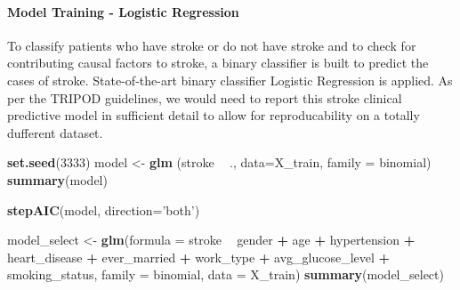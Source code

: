 \documentclass[]{article}
\newenvironment{Shaded}{\begin{snugshade}}{\end{snugshade}}
\newcommand{\DataTypeTok}[1]{\textcolor[rgb]{0.13,0.29,0.53}{#1}}
\newcommand{\DecValTok}[1]{\textcolor[rgb]{0.00,0.00,0.81}{#1}}
\newcommand{\KeywordTok}[1]{\textcolor[rgb]{0.13,0.29,0.53}{\textbf{#1}}}
\newcommand{\NormalTok}[1]{#1}
\newcommand{\OperatorTok}[1]{\textcolor[rgb]{0.81,0.36,0.00}{\textbf{#1}}}
\newcommand{\StringTok}[1]{\textcolor[rgb]{0.31,0.60,0.02}{#1}}
\let\oldparagraph\paragraph
\renewcommand{\paragraph}[1]{\oldparagraph{#1}\mbox{}}
\begin{document}
\hypertarget{model-training---logistic-regression}{%
\paragraph{Model Training - Logistic
Regression}\label{model-training---logistic-regression}}

To classify patients who have stroke or do not have stroke and to check
for contributing causal factors to stroke, a binary classifier is built
to predict the cases of stroke. State-of-the-art binary classifier
Logistic Regression is applied. As per the TRIPOD guidelines, we would
need to report this stroke clinical predictive model in sufficient
detail to allow for reproducability on a totally dufferent dataset.

\begin{Shaded}
\begin{Highlighting}[]
\KeywordTok{set.seed}\NormalTok{(}\DecValTok{3333}\NormalTok{)}
\NormalTok{model <-}\StringTok{ }\KeywordTok{glm}\NormalTok{ (stroke }\OperatorTok{~}\StringTok{ }\NormalTok{., }\DataTypeTok{data=}\NormalTok{X_train, }\DataTypeTok{family =}\NormalTok{ binomial)}
\KeywordTok{summary}\NormalTok{(model)}
\end{Highlighting}
\end{Shaded}

\begin{Shaded}
\begin{Highlighting}[]
\KeywordTok{stepAIC}\NormalTok{(model, }\DataTypeTok{direction=}\StringTok{'both'}\NormalTok{)}
\end{Highlighting}
\end{Shaded}

\begin{Shaded}
\begin{Highlighting}[]
\NormalTok{model_select <-}\StringTok{ }\KeywordTok{glm}\NormalTok{(}\DataTypeTok{formula =}\NormalTok{ stroke }\OperatorTok{~}\StringTok{ }\NormalTok{gender }\OperatorTok{+}\StringTok{ }\NormalTok{age }\OperatorTok{+}\StringTok{ }\NormalTok{hypertension }\OperatorTok{+}\StringTok{ }\NormalTok{heart_disease }\OperatorTok{+}\StringTok{ }
\StringTok{    }\NormalTok{ever_married }\OperatorTok{+}\StringTok{ }\NormalTok{work_type }\OperatorTok{+}\StringTok{ }\NormalTok{avg_glucose_level }\OperatorTok{+}\StringTok{ }\NormalTok{smoking_status, }
    \DataTypeTok{family =}\NormalTok{ binomial, }\DataTypeTok{data =}\NormalTok{ X_train)}
\KeywordTok{summary}\NormalTok{(model_select)}
\end{Highlighting}
\end{Shaded}
\end{document}
